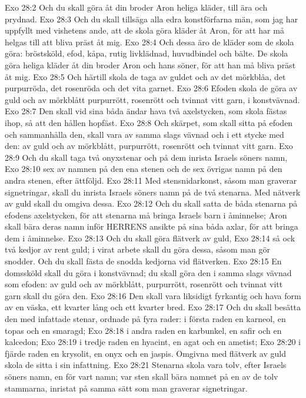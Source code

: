 Exo 28:2  Och du skall göra åt din broder Aron heliga kläder, till ära och prydnad.
Exo 28:3  Och du skall tillsäga alla edra konstförfarna män, som jag har uppfyllt med vishetens ande, att de skola göra kläder åt Aron, för att har må helgas till att bliva präst åt mig.
Exo 28:4  Och dessa äro de kläder som de skola göra: bröstsköld, efod, kåpa, rutig livklädnad, huvudbindel och bälte. De skola göra heliga kläder åt din broder Aron och hans söner, för att han må bliva präst åt mig.
Exo 28:5  Och härtill skola de taga av guldet och av det mörkblåa, det purpurröda, det rosenröda och det vita garnet.
Exo 28:6  Efoden skola de göra av guld och av mörkblått purpurrött, rosenrött och tvinnat vitt garn, i konstvävnad.
Exo 28:7  Den skall vid sina båda ändar hava två axelstycken, som skola fästas ihop, så att den hållen hopfäst.
Exo 28:8  Och skärpet, som skall sitta på efoden och sammanhålla den, skall vara av samma slags vävnad och i ett stycke med den: av guld och av mörkblått, purpurrött, rosenrött och tvinnat vitt garn.
Exo 28:9  Och du skall taga två onyxstenar och på dem inrista Israels söners namn,
Exo 28:10  sex av namnen på den ena stenen och de sex övrigas namn på den andra stenen, efter ättföljd.
Exo 28:11  Med stensnidarkonst, såsom man graverar signetringar, skall du inrista Israels söners namn på de två stenarna. Med nätverk av guld skall du omgiva dessa.
Exo 28:12  Och du skall satta de båda stenarna på efodens axelstycken, för att stenarna må bringa Israels barn i åminnelse; Aron skall bära deras namn inför HERRENS ansikte på sina båda axlar, för att bringa dem i åminnelse.
Exo 28:13  Och du skall göra flätverk av guld,
Exo 28:14  så ock två kedjor av rent guld; i virat arbete skall du göra dessa, såsom man gör snodder. Och du skall fästa de snodda kedjorna vid flätverken.
Exo 28:15  En domssköld skall du göra i konstvävnad; du skall göra den i samma slags vävnad som efoden: av guld och av mörkblått, purpurrött, rosenrött och tvinnat vitt garn skall du göra den.
Exo 28:16  Den skall vara liksidigt fyrkantig och hava form av en väska, ett kvarter lång och ett kvarter bred.
Exo 28:17  Och du skall besätta den med infattade stenar, ordnade på fyra rader: i första raden en karneol, en topas och en smaragd;
Exo 28:18  i andra raden en karbunkel, en safir och en kalcedon;
Exo 28:19  i tredje raden en hyacint, en agat och en ametist;
Exo 28:20  i fjärde raden en krysolit, en onyx och en jaspis. Omgivna med flätverk av guld skola de sitta i sin infattning.
Exo 28:21  Stenarna skola vara tolv, efter Israels söners namn, en för vart namn; var sten skall bära namnet på en av de tolv stammarna, inristat på samma sätt som man graverar signetringar.

